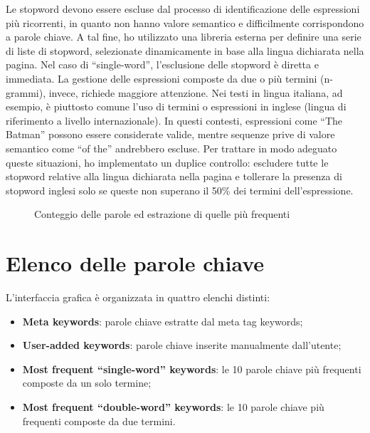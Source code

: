 Le \gls{stopword} devono essere escluse dal processo di identificazione delle espressioni più ricorrenti, in quanto non hanno valore semantico e difficilmente corrispondono a parole chiave. A tal fine, ho utilizzato una libreria esterna per definire una serie di liste di \gls{stopword}, selezionate dinamicamente in base alla lingua dichiarata nella pagina. Nel caso di “single-word”, l’esclusione delle \gls{stopword} è diretta e immediata. La gestione delle espressioni composte da due o più termini (n-grammi), invece, richiede maggiore attenzione. Nei testi in lingua italiana, ad esempio, è piuttosto comune l’uso di termini o espressioni in inglese (lingua di riferimento a livello internazionale). In questi contesti, espressioni come “The Batman” possono essere considerate valide, mentre sequenze prive di valore semantico come “of the” andrebbero escluse. Per trattare in modo adeguato queste situazioni, ho implementato un duplice controllo: escludere tutte le \gls{stopword} relative alla lingua dichiarata nella pagina e tollerare la presenza di \gls{stopword} inglesi solo se queste non superano il 50\% dei termini dell’espressione.

\begin{figure}[H]
  \centering 
  \caption{Conteggio delle parole ed estrazione di quelle più frequenti}
  \label{fig:word_count}
\end{figure}

\section{Elenco delle parole chiave}
\label{sec:keyword-list}

L'interfaccia grafica è organizzata in quattro elenchi distinti: 
\begin{itemize}
  \item \textbf{Meta keywords}: parole chiave estratte dal meta tag keywords;
  \item \textbf{User-added keywords}: parole chiave inserite manualmente dall'utente;
  \item \textbf{Most frequent “single-word” keywords}: le 10 parole chiave più frequenti composte da un solo termine;
  \item \textbf{Most frequent “double-word” keywords}: le 10 parole chiave più frequenti composte da due termini.
\end{itemize}

